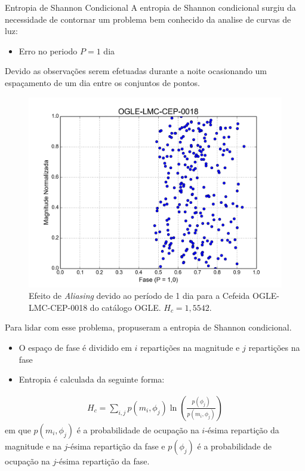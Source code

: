 \documentclass{beamer}
\begin{document}
\begin{frame}[allowframebreaks]{Entropia de Shannon Condicional}
A entropia de Shannon condicional surgiu da necessidade de contornar um
problema bem conhecido da analise de curvas de luz:
\begin{itemize}
  \item Erro no periodo $P=1$ dia
\end{itemize}

Devido as observações serem efetuadas durante a noite ocasionando um espaçamento de um dia entre os conjuntos de pontos.

\framebreak

\begin{figure}
\centering
\includegraphics[width=0.65\linewidth]{esp_fase_1dia.png}
\caption{Efeito de \textit{Aliasing} devido ao período de 1 dia para a Cefeida OGLE-LMC-CEP-0018 do catálogo OGLE. $H_c=1,5542$.}
\label{fig:periodo1dia}
\end{figure}

\framebreak

Para lidar com esse problema, \citet{ce} propuseram a entropia de Shannon condicional.

\begin{itemize}
  \item O espaço de fase é dividido em $i$ repartições na magnitude e $j$ repartições na fase
  \item Entropia é calculada da seguinte forma:
\end{itemize}
\begin{align}
H_c = \sum_{i,j} p(m_i,\phi_j) \ln \left( \frac{p(\phi_j)}{p(m_i,\phi_j)} \right)
\end{align}
em que $p(m_i,\phi_j)$ é a probabilidade de ocupação na $i$-ésima repartição da magnitude e na $j$-ésima repartição da fase e $p(\phi_j)$ é a probabilidade de ocupação na $j$-ésima repartição da fase.
\framebreak


\end{frame}
\end{document}
